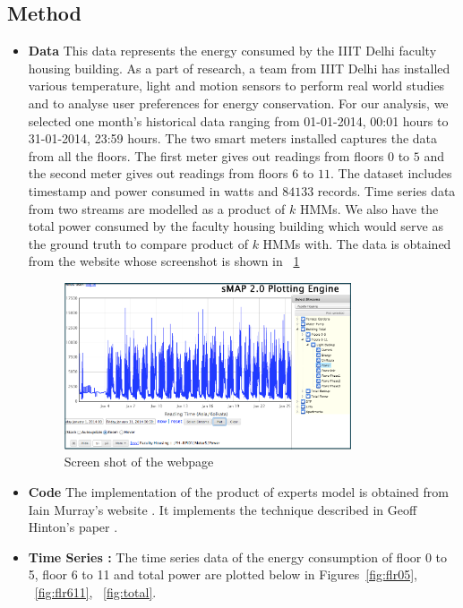 \documentclass[10pt, conference, compsocconf]{IEEEtran}
\begin{document}
\subsection{Method}
\begin{itemize}
\item \textbf{ Data } This data represents the energy consumed by the IIIT Delhi faculty housing building. As a part of research, a team from IIIT Delhi has installed various temperature, light and motion sensors to perform real world studies and to analyse user preferences for energy conservation. For our analysis, we selected one month's historical data ranging from 01-01-2014, 00:01 hours to 31-01-2014, 23:59 hours. The two smart meters installed captures the data from all the floors. The first meter gives out readings from floors $0$ to $5$ and the second meter gives out readings from floors $6$ to $11$. The dataset includes timestamp and power consumed in watts and $84133$ records. Time series data from two streams are modelled as a product of $k$ HMMs. We also have the total power consumed by the faculty housing building which would serve as the ground truth to compare product of $k$ HMMs with. The data is obtained from the website whose screenshot is shown in ~\ref{fig:screenshot}

\begin{figure}[t]
\centering
\includegraphics[width=0.8\textwidth,height=0.35\textheight]{screenshot.png}
\caption{Screen shot of the webpage}
\label{fig:screenshot}
\end{figure}



\item \textbf{ Code } The implementation of the product of experts model is obtained from Iain Murray's website \cite{code}. It implements the technique described in Geoff Hinton's paper \cite{hinton2000}. 

\item \textbf{ Time Series :} The time series data of the energy consumption of floor 0 to 5, floor 6 to 11 and total power are plotted below in Figures~\ref{fig:flr05}, ~\ref{fig:flr611}, ~\ref{fig:total}.


\end{itemize}
\end{document}
